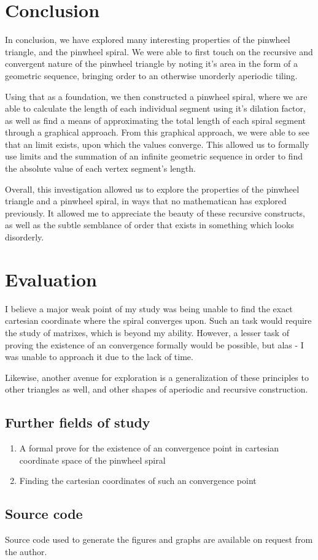 \section{Conclusion}
In conclusion, we have explored many interesting properties of the pinwheel triangle, and the pinwheel spiral. We were able to first touch on the recursive and convergent nature of the pinwheel triangle by noting it's area in the form of a geometric sequence, bringing order to an otherwise unorderly aperiodic tiling.

Using that as a foundation, we then constructed a pinwheel spiral, where we are able to calculate the length of each individual segment using it's dilation factor, as well as find a means of approximating the total length of each spiral segment through a graphical approach. From this graphical approach, we were able to see that an limit exists, upon which the values converge. This allowed us to formally use limits and the summation of an infinite geometric sequence in order to find the absolute value of each vertex segment's length.

Overall, this investigation allowed us to explore the properties of the pinwheel triangle and a pinwheel spiral, in ways that no mathematican has explored previously. It allowed me to appreciate the beauty of these recursive constructs, as well as the subtle semblance of order that exists in something which looks disorderly.

\section{Evaluation}
I believe a major weak point of my study was being unable to find the exact cartesian coordinate where the spiral converges upon. Such an task would require the study of matrixes, which is beyond my ability. However, a lesser task of proving the existence of an convergence formally would be possible, but alas - I was unable to approach it due to the lack of time.

Likewise, another avenue for exploration is a generalization of these principles to other triangles as well, and other shapes of aperiodic and recursive construction.

\subsection{Further fields of study}
\begin{enumerate}
    \item A formal prove for the existence of an convergence point in cartesian coordinate space of the pinwheel spiral
    \item Finding the cartesian coordinates of such an convergence point
\end{enumerate}

\subsection{Source code}
Source code used to generate the figures and graphs are available on request from the author.
